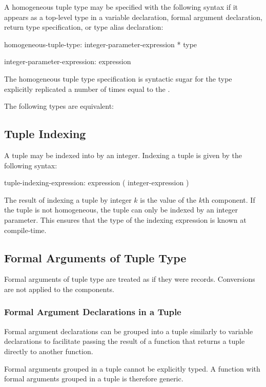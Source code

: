 
A homogeneous tuple type may be specified with the following syntax if
it appears as a top-level type in a variable declaration, formal
argument declaration, return type specification, or type alias
declaration:
\begin{syntax}
homogeneous-tuple-type:
  integer-parameter-expression * type

integer-parameter-expression:
  expression
\end{syntax}
The homogeneous tuple type specification is syntactic sugar for the
type explicitly replicated a number of times equal to the
.
\begin{example}
The following types are equivalent:
\begin{center}
 \hspace{2pc} 
\end{center}
\end{example}

\subsection{Tuple Indexing}
\label{Tuple_Indexing}

A tuple may be indexed into by an integer.  Indexing a tuple is given
by the following syntax:
\begin{syntax}
tuple-indexing-expression:
  expression ( integer-expression )
\end{syntax}

The result of indexing a tuple by integer $k$ is the value of the
$k$th component.  If the tuple is not homogeneous, the tuple can only
be indexed by an integer parameter.  This ensures that the type of the
indexing expression is known at compile-time.

\subsection{Formal Arguments of Tuple Type}
\label{Formal_Arguments_of_Tuple_Type}


\begin{status}
Formal arguments of tuple type are treated as if they were records.
Conversions are not applied to the components.
\end{status}

\subsubsection{Formal Argument Declarations in a Tuple}
\label{Formal_Argument_Declarations_in_a_Tuple}

Formal argument declarations can be grouped into a tuple similarly to
variable declarations to facilitate passing the result of a function that
returns a tuple directly to another function.

\begin{status}Formal arguments grouped in a tuple cannot be explicitly
typed. A function with formal arguments grouped in a tuple is
therefore generic.
\end{status}
